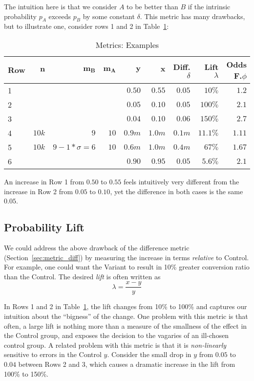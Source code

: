 \documentclass[letterpaper,12pt]{article}
\newcommand{\bb}[1]{\mathbf{#1}}
\begin{document}
The intuition here is that we consider \(A\) to be better than \(B\)
if the intrinsic probability \(p_A\) exceeds \(p_B\) by some constant
\(\delta\). This metric has many drawbacks, but to illustrate one,
consider rows 1 and 2 in Table~\ref{table:examples}:
\begin{table}
\centering
\begin{tabular}{|l|r|r|r|r|r|r|r|r|} \hline\hline
  {\bf Row} & \(\bb{n}\) & \(\bb{m_B}\) & \(\bb{m_A}\) & \(\bb{y}\) & \(\bb{x}\) & Diff. \(\delta\) & Lift \(\lambda\) & Odds F.\(\phi\) \\
  \hline\hline
  1 & & & & \(0.50\) & \(0.55\) & \(0.05\) & \(10\%\) & \(1.2\)\\ \hline
  2 & & & & \(0.05\) & \(0.10\) & \(0.05\) & \(100\%\) & \(2.1\)\\ \hline
  3 & & & & \(0.04\) & \(0.10\) & \(0.06\) & \(150\%\) & \(2.7\)\\ \hline 
  4 & \(10k\) & \(9\) & \(10\) & \(0.9m\) & \(1.0m\) & \(0.1m\) & \(11.1\%\) & \(1.11\)\\ \hline
  5 & \(10k\) & \(9-1*\sigma=6\) & \(10\) & \(0.6m\) & \(1.0m\) & \(0.4m\) & \(67\%\) & \(1.67\)\\ \hline
  6 & & & & \(0.90\) & \(0.95\) & \(0.05\) & \(5.6\%\) & \(2.1\)\\
  \hline\hline
\end{tabular}
\caption{Metrics: Examples}
\label{table:examples}
\end{table}
An increase in Row 1 from \(0.50\) to \(0.55\) feels intuitively very
different from the increase in Row 2 from \(0.05\) to \(0.10\), yet
the difference in both cases is the same \(0.05\).

\subsection{Probability Lift}
\label{sec:metric_lift}
We could address the above drawback of the difference metric
(Section~\ref{sec:metric_diff}) by measuring the 
increase in terms {\em relative} to Control. For example, one could
want the Variant to result in 10\% greater conversion ratio than the
Control. The desired {\em lift} is often written as
\begin{equation}
\label{eq:lift}
\lambda = \frac{x-y}{y}
\end{equation}

In Rows 1 and 2 in Table~\ref{table:examples}, the lift changes from
10\% to 100\% and captures our intuition about the ``bigness'' of the
change. One problem with this metric is that often, a large lift is
nothing more than a measure of the smallness of the effect in the
Control group, and exposes the decision to the vagaries of an
ill-chosen control group. A related problem with this metric is that
it is {\em non-linearly} sensitive to errors in the Control
\(y\). Consider the small drop in \(y\) from \(0.05\) to \(0.04\)
between Rows 2 and 3, which causes a dramatic increase in the lift
from 100\% to 150\%.
\end{document}
